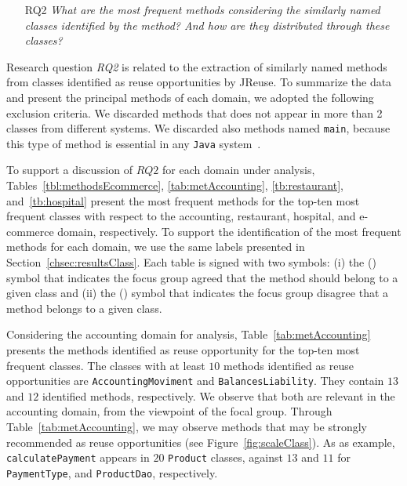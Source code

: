 \begin{itemize}
	\item[RQ2] \textit{What are the most frequent methods considering the similarly named classes identified by the method? And how are they distributed through these classes?}
\end{itemize}

Research question \textit{RQ2} is related to the extraction of similarly named methods from classes identified as reuse opportunities by JReuse. To summarize the data and present the principal methods of each domain, we adopted the following exclusion criteria. We discarded methods that does not appear in more than 2 classes from different systems. %
We discarded also methods named \texttt{main}, because  this type of method is essential in any \texttt{Java} system~\citep{Rountev}.


To support a discussion of $RQ2$ for each domain under analysis, Tables~\ref{tbl:methodsEcommerce}, \ref{tab:metAccounting}, \ref{tb:restaurant}, and~\ref{tb:hospital} present the most frequent methods for the top-ten most frequent classes with respect to the accounting, restaurant, hospital, and e-commerce domain, respectively. %
To support the identification of the most frequent methods for each domain, we use the same labels presented in Section~\ref{chsec:resultsClass}. Each table is signed with two symbols: (i) the (\checkmark) symbol that indicates the focus group agreed that the method should belong to a given class and (ii)  the (\xmark) symbol that indicates the focus group disagree that a method belongs to a given class.


Considering the accounting domain for analysis, Table~\ref{tab:metAccounting} presents the methods identified as reuse opportunity for the top-ten most frequent classes. The classes with at least $10$ methods identified as reuse opportunities are \texttt{AccountingMoviment} and \texttt{BalancesLiability}. They contain $13$ and $12$ identified methods, respectively. We observe that both are relevant in the accounting domain, from the viewpoint of the focal group. Through Table~\ref{tab:metAccounting}, we may observe methods that may be strongly recommended as reuse opportunities (see Figure~\ref{fig:scaleClass}). As as example, \texttt{calculatePayment} appears in $20$ \texttt{Product} classes, against $13$ and $11$ for \texttt{PaymentType}, and \texttt{ProductDao}, respectively. 

